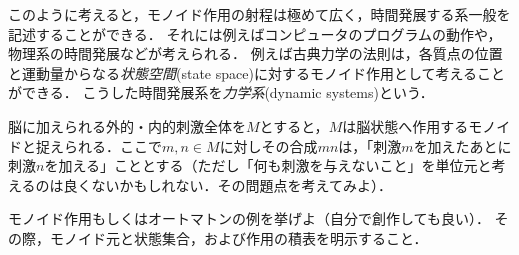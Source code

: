 \documentclass[11pt,a4paper, dvipdfmx]{jsarticle}
\begin{document}
 
このように考えると，モノイド作用の射程は極めて広く，時間発展する系一般を記述することができる．
それには例えばコンピュータのプログラムの動作や，物理系の時間発展などが考えられる．
例えば古典力学の法則は，各質点の位置と運動量からなる\emph{状態空間}(state space)に対するモノイド作用として考えることができる．
こうした時間発展系を\emph{力学系}(dynamic systems)という．



\begin{rei}{}{}
    脳に加えられる外的・内的刺激全体を$M$とすると，$M$は脳状態へ作用するモノイドと捉えられる．ここで$m, n \in M$に対しその合成$mn$は，「刺激$m$を加えたあとに刺激$n$を加える」こととする（ただし「何も刺激を与えないこと」を単位元と考えるのは良くないかもしれない．その問題点を考えてみよ）．
\end{rei}

\begin{renshu}{}{}
モノイド作用もしくはオートマトンの例を挙げよ（自分で創作しても良い）．
その際，モノイド元と状態集合，および作用の積表を明示すること．
\end{renshu}









\end{document}
